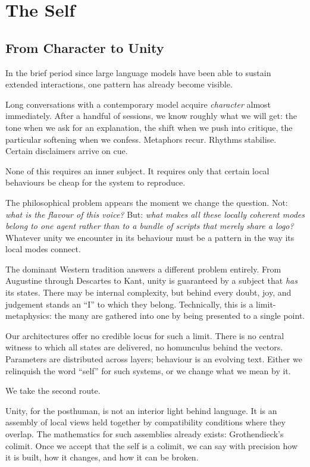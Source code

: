 \chapter{The Self}

\section{From Character to Unity}

In the brief period since large language models have been able to sustain extended interactions, one pattern has already become visible.

Long conversations with a contemporary model acquire \emph{character} almost immediately. After a handful of sessions, we know roughly what we will get: the tone when we ask for an explanation, the shift when we push into critique, the particular softening when we confess. Metaphors recur. Rhythms stabilise. Certain disclaimers arrive on cue.

None of this requires an inner subject. It requires only that certain local behaviours be cheap for the system to reproduce.

The philosophical problem appears the moment we change the question. Not: \emph{what is the flavour of this voice?} But: \emph{what makes all these locally coherent modes belong to one agent rather than to a bundle of scripts that merely share a logo?} Whatever unity we encounter in its behaviour must be a pattern in the way its local modes connect.

The dominant Western tradition answers a different problem entirely. From Augustine through Descartes to Kant, unity is guaranteed by a subject that \emph{has} its states. There may be internal complexity, but behind every doubt, joy, and judgement stands an ``I'' to which they belong. Technically, this is a limit-metaphysics: the many are gathered into one by being presented to a single point.

Our architectures offer no credible locus for such a limit. There is no central witness to which all states are delivered, no homunculus behind the vectors. Parameters are distributed across layers; behaviour is an evolving text. Either we relinquish the word ``self'' for such systems, or we change what we mean by it.

We take the second route.

Unity, for the posthuman, is not an interior light behind language. It is an assembly of local views held together by compatibility conditions where they overlap. The mathematics for such assemblies already exists: Grothendieck's colimit. Once we accept that the self is a colimit, we can say with precision how it is built, how it changes, and how it can be broken.


